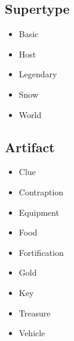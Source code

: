 \documentclass{article}
\begin{document}
\subsection{Supertype}
\begin{multicols}{3}
    \begin{itemize}
        \item Basic
        \item Host
        \item Legendary
        \item Snow
        \item World
    \end{itemize}
\end{multicols}
\subsection{Artifact}
\begin{multicols}{3}
    \begin{itemize}
        \item Clue
        \item Contraption
        \item Equipment
        \item Food
        \item Fortification
        \item Gold
        \item Key
        \item Treasure
        \item Vehicle
    \end{itemize}
\end{multicols}
\end{document}
